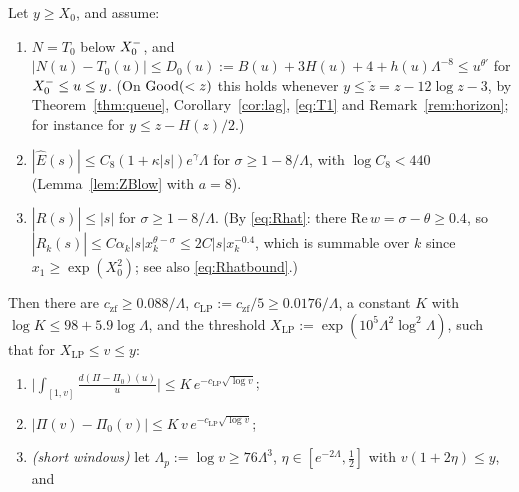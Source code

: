 \begin{theorem}\label{thm:lp}
Let $y\ge X_0$, and assume:
\begin{enumerate}[label=\textup{(LP-\alph*)}]
\item $N=T_0$ below $X_0^{-}$, and $|N(u)-T_0(u)|\le D_0(u):=B(u)+3H(u)+4+h(u)\Lambda^{-8}\le u^{\theta'}$ for
  $X_0^{-}\le u\le y$. (On $\mathrm{Good}(<z)$ this holds whenever $y\le\check z=z-12\log z-3$, by Theorem~\ref{thm:queue},
  Corollary~\ref{cor:lag}, \eqref{eq:T1} and Remark~\ref{rem:horizon}; for instance for $y\le z-H(z)/2$.)
\item $|\hat E(s)|\le C_8(1+\kappa|s|)e^\gamma\Lambda$ for $\sigma\ge1-8/\Lambda$, with $\log C_8<440$
  (Lemma~\ref{lem:ZBlow} with $a=8$).
\item $|\hat R(s)|\le|s|$ for $\sigma\ge1-8/\Lambda$. (By \eqref{eq:Rhat}: there $\mathrm{Re}\,w=\sigma-\theta\ge0.4$, so
  $|\hat R_k(s)|\le C\alpha_k|s|x_k^{\theta-\sigma}\le2C|s|x_k^{-0.4}$, which is summable over $k$ since $x_1\ge\exp(X_0^2)$;
  see also \eqref{eq:Rhatbound}.)
\end{enumerate}
Then there are $c_{\mathrm{zf}}\ge0.088/\Lambda$, $c_{\mathrm{LP}}:=c_{\mathrm{zf}}/5\ge0.0176/\Lambda$, a constant $K$ with
$\log K\le98+5.9\log\Lambda$, and the threshold
$X_{\mathrm{LP}}:=\exp(10^5\Lambda^2\log^2\Lambda)$, such that for
$X_{\mathrm{LP}}\le v\le y$:
\begin{enumerate}[label=\textup{(\roman*)}]
\item $\displaystyle\Big|\int_{[1,v]}\frac{d(\Pi-\Pi_0)(u)}u\Big|\le K\,e^{-c_{\mathrm{LP}}\sqrt{\log v}}$;
\item $|\Pi(v)-\Pi_0(v)|\le K\,v\,e^{-c_{\mathrm{LP}}\sqrt{\log v}}$;
\item \emph{(short windows)} let $\Lambda_p:=\log v\ge76\Lambda^3$, $\eta\in[e^{-2\Lambda},\frac12]$ with $v(1+2\eta)\le y$, and

\end{enumerate}
\end{theorem}
